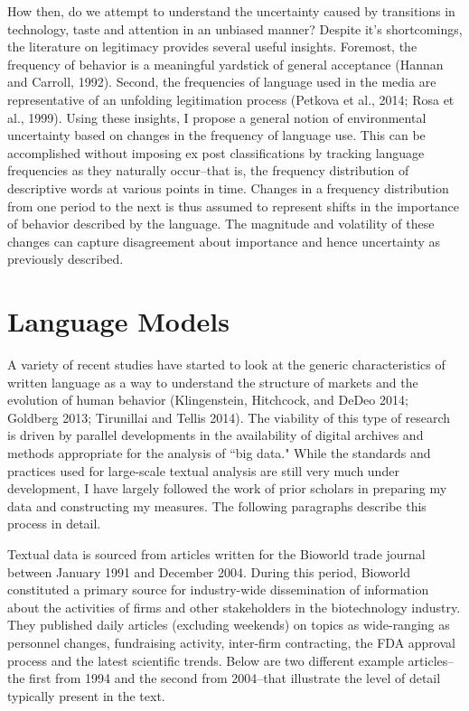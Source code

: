 How then, do we attempt to understand the uncertainty caused by transitions in technology, taste and attention in an unbiased manner? Despite it's shortcomings, the literature on legitimacy provides several useful insights. Foremost, the frequency of  behavior is a meaningful yardstick of general acceptance (Hannan and Carroll, 1992). Second, the frequencies of language used in the media are representative of an unfolding legitimation process (Petkova et al., 2014; Rosa et al., 1999). Using these insights, I propose a general notion of environmental uncertainty based on changes in the frequency of language use. This can be accomplished without imposing ex post classifications by tracking language frequencies as they naturally occur--that is, the frequency distribution of descriptive words at various points in time. Changes in a frequency distribution from one period to the next is thus assumed to represent shifts in the importance of behavior described by the language. The magnitude and volatility of these changes can capture disagreement about importance and hence uncertainty as previously described. 

\section{Language Models}

A variety of recent studies have started to look at the generic characteristics of written language as a way to understand the structure of markets and the evolution of human behavior (Klingenstein, Hitchcock, and DeDeo 2014; Goldberg 2013; Tirunillai and Tellis 2014). The viability of this type of research is driven by parallel developments in the availability of digital archives and methods appropriate for the analysis of ``big data." While the standards and practices used for large-scale textual analysis are still very much under development, I have largely followed the work of prior scholars in preparing my data and constructing my measures. The following paragraphs describe this process in detail.

Textual data is sourced from articles written for the Bioworld trade journal between January 1991 and December 2004. During this period, Bioworld constituted a primary source for industry-wide dissemination of information about the activities of firms and other stakeholders in the biotechnology industry. They published daily articles (excluding weekends) on topics as wide-ranging as personnel changes, fundraising activity, inter-firm contracting, the FDA approval process and the latest scientific trends. Below are two different example articles--the first from 1994 and the second from 2004--that illustrate the level of detail typically present in the text.


